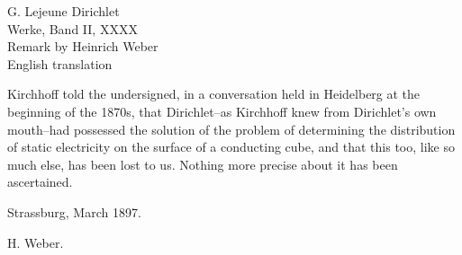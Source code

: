 \documentclass[11pt]{article}
\newcommand{\paperhead}[3]{\begin{center}{\Large G. Lejeune Dirichlet}\\[0.25em]{\large Werke, Band II, #1}\\[0.75em]{\LARGE #2}\\[0.35em]{\large #3}\end{center}\bigskip}
\newcommand{\sign}[1]{\begin{flushright}#1\end{flushright}}
\begin{document}
\paperhead{XXXX}{Remark by Heinrich Weber}{English translation}

Kirchhoff told the undersigned, in a conversation held in Heidelberg at the beginning of the 1870s, that Dirichlet--as Kirchhoff knew from Dirichlet's own mouth--had possessed the solution of the problem of determining the distribution of static electricity on the surface of a conducting cube, and that this too, like so much else, has been lost to us. Nothing more precise about it has been ascertained.

Strassburg, March 1897.\sign{H. Weber.}
\end{document}
